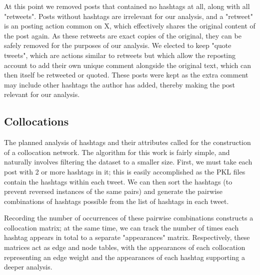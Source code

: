\documentclass[a4paper,11pt]{article}  %
\begin{document}
	At this point we removed posts that contained no hashtags at all, along with all "retweets". Posts without hashtags are irrelevant for our analysis, and a "retweet" is an posting action common on X, which effectively shares the original content of the post again. As these retweets are exact copies of the original, they can be safely removed for the purposes of our analysis. We elected to keep "quote tweets", which are actions similar to retweets but which allow the reposting account to add their own unique comment alongside the original text, which can then itself be retweeted or quoted. These posts were kept as the extra comment may include other hashtags the author has added, thereby making the post relevant for our analysis.

	\subsection{Collocations}
	\label{subsec:collocation}
	The planned analysis of hashtags and their attributes called for the construction of a collocation network. The algorithm for this work is fairly simple, and naturally involves filtering the dataset to a smaller size. First, we must take each post with 2 or more hashtags in it; this is easily accomplished as the PKL files contain the hashtags within each tweet. We can then sort the hashtags (to prevent reversed instances of the same pairs) and generate the pairwise combinations of hashtags possible from the list of hashtags in each tweet.
	
	Recording the number of occurrences of these pairwise combinations constructs a collocation matrix; at the same time, we can track the number of times each hashtag appears in total to a separate "appearances" matrix. Respectively, these matrices act as edge and node tables, with the appearances of each collocation representing an edge weight and the appearances of each hashtag supporting a deeper analysis. 
\end{document}
